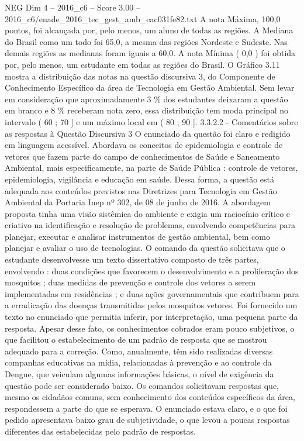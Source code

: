\begin{textsample}{NEG Dim 4 – 2016\_c6 – Score 3.00 – 2016\_c6/enade\_2016\_tec\_gest\_amb\_eac031fe82.txt}
A nota Máxima, 100,0 pontos, foi alcançada por, pelo menos, um aluno de todas as regiões.
A Mediana do Brasil como um todo foi 65,0, a mesma das regiões Nordeste e Sudeste.
Nas demais regiões as medianas foram iguais a 60,0.
A nota Mínima ( 0,0 ) foi obtida por, pelo menos, um estudante em todas as regiões do Brasil.
O Gráfico 3.11 mostra a distribuição das notas na questão discursiva 3, do Componente de Conhecimento Específico da área de Tecnologia em Gestão Ambiental.
Sem levar em consideração que aproximadamente 3 \% dos estudantes deixaram a questão em branco e 8 \% receberam nota zero, essa distribuição tem moda principal no intervalo ( 60 ; 70 ] e um máximo local em ( 80 ; 90 ]. 3.3.2.2 - Comentários sobre as respostas à Questão Discursiva 3 O enunciado da questão foi claro e redigido em linguagem acessível.
Abordava os conceitos de epidemiologia e controle de vetores que fazem parte do campo de conhecimentos de Saúde e Saneamento Ambiental, mais especificamente, na parte de Saúde Pública : controle de vetores, epidemiologia, vigilância e educação em saúde.
Dessa forma, a questão está adequada aos conteúdos previstos nas Diretrizes para Tecnologia em Gestão Ambiental da Portaria Inep nº 302, de 08 de junho de 2016.
A abordagem proposta tinha uma visão sistêmica do ambiente e exigia um raciocínio crítico e criativo na identificação e resolução de problemas, envolvendo competências para planejar, executar e analisar instrumentos de gestão ambiental, bem como planejar e avaliar o uso de tecnologias.
O comando da questão solicitava que o estudante desenvolvesse um texto dissertativo composto de três partes, envolvendo : duas condições que favorecem o desenvolvimento e a proliferação dos mosquitos ; duas medidas de prevenção e controle dos vetores a serem implementadas em residências ; e duas ações governamentais que contribuem para a erradicação das doenças transmitidas pelos mosquitos vetores.
Foi fornecido um texto no enunciado que permitia inferir, por interpretação, uma pequena parte da resposta.
Apesar desse fato, os conhecimentos cobrados eram pouco subjetivos, o que facilitou o estabelecimento de um padrão de resposta que se mostrou adequado para a correção.
Como, anualmente, têm sido realizadas diversas companhas educativas na mídia, relacionadas à prevenção e ao controle da Dengue, que veiculam algumas informações básicas, o nível de exigência da questão pode ser considerado baixo.
Os comandos solicitavam respostas que, mesmo os cidadãos comuns, sem conhecimento dos conteúdos específicos da área, respondessem a parte do que se esperava.
O enunciado estava claro, e o que foi pedido apresentava baixo grau de subjetividade, o que levou a poucas respostas diferentes das estabelecidas pelo padrão de respostas.

\end{textsample}
